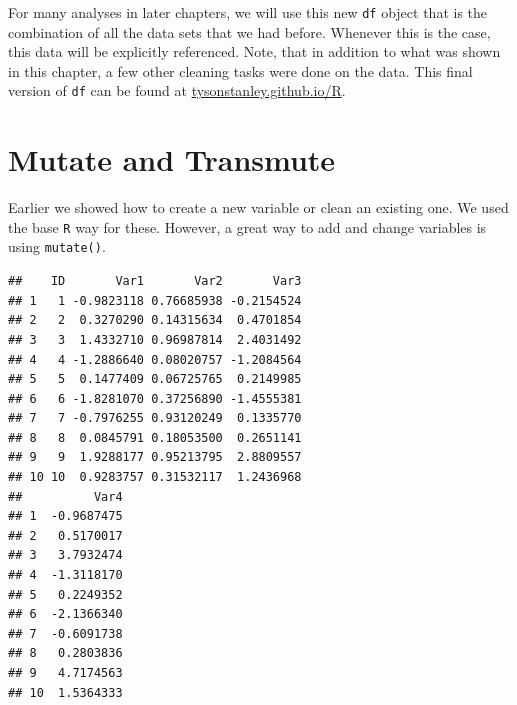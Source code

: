 \documentclass[]{tufte-book}
\newenvironment{Shaded}{}{}
\newcommand{\KeywordTok}[1]{\textcolor[rgb]{0.00,0.44,0.13}{\textbf{#1}}}
\newcommand{\DataTypeTok}[1]{\textcolor[rgb]{0.56,0.13,0.00}{#1}}
\newcommand{\DecValTok}[1]{\textcolor[rgb]{0.25,0.63,0.44}{#1}}
\newcommand{\StringTok}[1]{\textcolor[rgb]{0.25,0.44,0.63}{#1}}
\newcommand{\OperatorTok}[1]{\textcolor[rgb]{0.40,0.40,0.40}{#1}}
\newcommand{\NormalTok}[1]{#1}
\theoremstyle{definition}
\theoremstyle{definition}
\theoremstyle{remark}
\begin{document}
For many analyses in later chapters, we will use this new \texttt{df}
object that is the combination of all the data sets that we had before.
Whenever this is the case, this data will be explicitly referenced.
Note, that in addition to what was shown in this chapter, a few other
cleaning tasks were done on the data. This final version of \texttt{df}
can be found at
\href{http://www.tysonstanley.github.io/R}{tysonstanley.github.io/R}.

\section*{Mutate and Transmute}\label{mutate-and-transmute}

Earlier we showed how to create a new variable or clean an existing one.
We used the base \texttt{R} way for these. However, a great way to add
and change variables is using \texttt{mutate()}.

\begin{Shaded}
\end{Shaded}

\begin{verbatim}
##    ID       Var1       Var2       Var3
## 1   1 -0.9823118 0.76685938 -0.2154524
## 2   2  0.3270290 0.14315634  0.4701854
## 3   3  1.4332710 0.96987814  2.4031492
## 4   4 -1.2886640 0.08020757 -1.2084564
## 5   5  0.1477409 0.06725765  0.2149985
## 6   6 -1.8281070 0.37256890 -1.4555381
## 7   7 -0.7976255 0.93120249  0.1335770
## 8   8  0.0845791 0.18053500  0.2651141
## 9   9  1.9288177 0.95213795  2.8809557
## 10 10  0.9283757 0.31532117  1.2436968
##          Var4
## 1  -0.9687475
## 2   0.5170017
## 3   3.7932474
## 4  -1.3118170
## 5   0.2249352
## 6  -2.1366340
## 7  -0.6091738
## 8   0.2803836
## 9   4.7174563
## 10  1.5364333
\end{verbatim}
\end{document}
